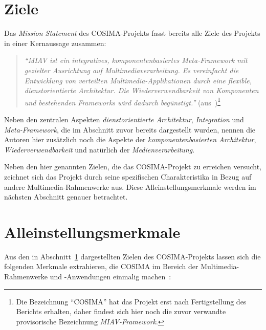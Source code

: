   
\section{Ziele} %
\label{sec:ziele_cosima}

  Das \emph{Mission Statement} des COSIMA-Projekts fasst bereits alle Ziele des Projekts in einer Kernaussage zusammen:

  \begin{quote}
    \emph{``MIAV ist ein integratives, komponentenbasiertes Meta-Framework mit gezielter Ausrichtung auf Multimediaverarbeitung. Es vereinfacht die Entwicklung von verteilten Multimedia-Applikationen durch eine flexible, dienstorientierte Architektur. Die Wiederverwendbarkeit von Komponenten und bestehenden Frameworks wird dadurch begünstigt.''} (aus~\citep[S. 2]{bericht})\footnote{Die Bezeichnung "`COSIMA"' hat das Projekt erst nach Fertigstellung des Berichts erhalten, daher findest sich hier noch die zuvor verwandte provisorische Bezeichnung \emph{MIAV-Framework}.}
  \end{quote}

  Neben den zentralen Aspekten \emph{dienstorientierte Architektur}, \emph{Integration} und \emph{Meta-Framework}, die im Abschnitt zuvor bereits dargestellt wurden, nennen die Autoren hier zusätzlich noch die Aspekte der \emph{komponentenbasierten Architektur}, \emph{Wiederverwendbarkeit} und natürlich der \emph{Medienverarbeitung}.
  
  Neben den hier genannten Zielen, die das COSIMA-Projekt zu erreichen versucht, zeichnet sich das Projekt durch seine spezifischen Charakteristika in Bezug auf andere Multimedia-Rahmenwerke aus. Diese Alleinstellungsmerkmale werden im nächsten Abschnitt genauer betrachtet.



\section{Alleinstellungsmerkmale} %
\label{sec:alleinstellungsmerkmale}

  Aus den in Abschnitt~\ref{sec:ziele_cosima} dargestellten Zielen des COSIMA-Projekts lassen sich die folgenden Merkmale extrahieren, die COSIMA im Bereich der Multimedia-Rahmenwerke und -Anwendungen einmalig machen~\citep[S. 3f]{bericht}:
  
